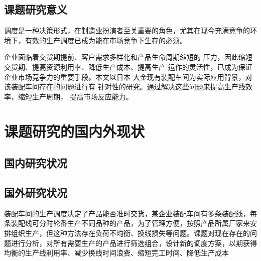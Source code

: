 \subsection{课题研究意义}
调度是一种决策形式，在制造业扮演者至关重要的角色，尤其在现今充满竞争的环境下，有效的生产调度已成为能在市场竞争下生存的必须。


企业面临着交货期提前、客户需求多样化和产品生命周期缩短的
压力，因此缩短交货期、提高资源利用率、降低生产成本、提高生产
运作的灵活性，已成为保证企业市场竞争力的重要手段。本文以日本
大金现有装配车间为实际应用背景，对该装配车间存在的问题进行有
针对性的研究。通过解决这些问题来提高生产线效率，缩短生产周期，
提高市场反应能力。
\section{课题研究的国内外现状}
\subsection{国内研究状况}

\subsection{国外研究状况}
装配车间的生产调度决定了产品能否准时交货，某企业装配车间有多条装配线，每条装配线可分时轮番生产不同品种的产品，为了管理方便，按照产品所属厂家来安排组织生产，但这种方法存在负荷不均衡、换线损失等问题。课题对现在存在的问题进行分析，对所有需要生产的产品进行筛选组合，设计新的调度方案，以期获得均衡的生产线利用率、减少换线时间浪费、缩短完工时间、降低生产成本
